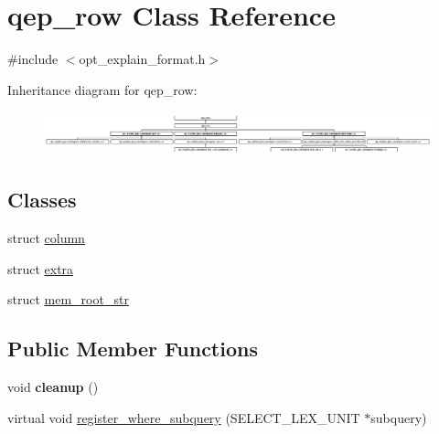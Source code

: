 \hypertarget{classqep__row}{}\section{qep\+\_\+row Class Reference}
\label{classqep__row}


{\ttfamily \#include $<$opt\+\_\+explain\+\_\+format.\+h$>$}

Inheritance diagram for qep\+\_\+row\+:\begin{figure}[H]
\begin{center}
\leavevmode
\includegraphics[height=1.271571cm]{classqep__row}
\end{center}
\end{figure}
\subsection*{Classes}
\begin{DoxyCompactItemize}
\item 
struct \mbox{\hyperlink{structqep__row_1_1column}{column}}
\item 
struct \mbox{\hyperlink{structqep__row_1_1extra}{extra}}
\item 
struct \mbox{\hyperlink{structqep__row_1_1mem__root__str}{mem\+\_\+root\+\_\+str}}
\end{DoxyCompactItemize}
\subsection*{Public Member Functions}
\begin{DoxyCompactItemize}
\item 
\mbox{\label{classqep__row_a269ab04ac718477fcabcc626c1abca41}} 
void {\bfseries cleanup} ()
\item 
virtual void \mbox{\hyperlink{classqep__row_ad5453e115753d93ac2abf2cabcb8ea03}{register\+\_\+where\+\_\+subquery}} (S\+E\+L\+E\+C\+T\+\_\+\+L\+E\+X\+\_\+\+U\+N\+IT $\ast$subquery)
\end{DoxyCompactItemize}
